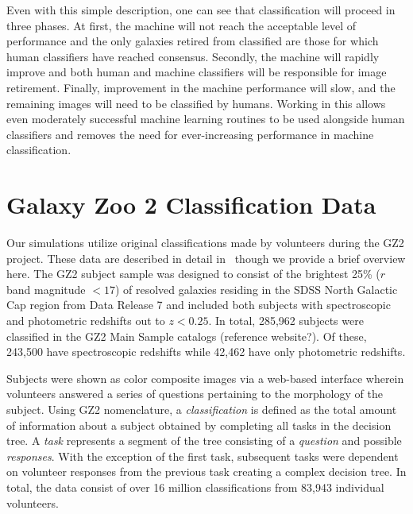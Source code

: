 \documentclass[twocolumn]{aastex6}
\begin{document}
Even with this simple description, one can see that classification will proceed in three phases. At first, the machine will not reach the acceptable level of performance and the only galaxies retired from classified are those for which human classifiers have reached consensus. Secondly, the machine will rapidly improve and both human and machine classifiers will be responsible for image retirement. Finally, improvement in the machine performance will slow, and the remaining images will need to be classified by humans. Working in this allows even moderately successful machine learning routines to be used alongside human classifiers and removes the need for ever-increasing performance in machine classification.


\section{Galaxy Zoo 2 Classification Data} \label{sec: data}

Our simulations utilize original classifications made by volunteers during the GZ2 project. 
These data are described in detail in~\cite{Willett2013} though we provide a brief overview here.  
The GZ2 subject sample was designed to consist of the brightest 25\% ($r$ band magnitude $< 17$) 
of resolved galaxies residing in the SDSS North Galactic Cap region from Data Release 7 
and included both subjects with spectroscopic and photometric redshifts out to $z < 0.25$.
In total, 285,962 subjects were classified in the GZ2 Main Sample catalogs (reference website?). 
Of these, 243,500 have spectroscopic redshifts while 42,462 have only photometric redshifts.  

Subjects were shown as color composite images via a web-based interface wherein 
volunteers answered a series of questions pertaining to the morphology of the subject.
Using GZ2 nomenclature,  a \textit{classification} is defined as the total amount of information about a subject 
obtained by completing all tasks in the decision tree. A \textit{task} represents a segment of the
tree consisting of a \textit{question} and possible \textit{responses}. 
With the exception of the first task, subsequent tasks were
dependent on volunteer responses from the previous task creating a complex decision tree. 
 In total, the data consist of over 16 million classifications from 83,943 individual volunteers. 
\end{document}
